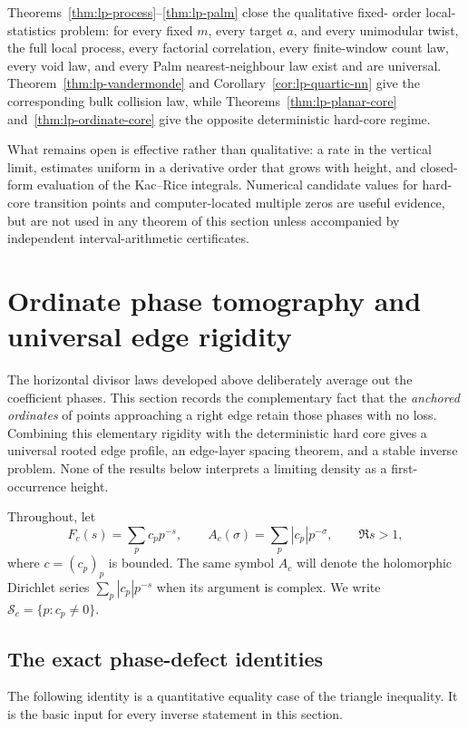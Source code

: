 \documentclass[11pt]{article}
\theoremstyle{definition}
\theoremstyle{remark}
\begin{document}
Theorems~\ref{thm:lp-process}--\ref{thm:lp-palm} close the qualitative fixed-
order local-statistics problem: for every fixed $m$, every target $a$, and
every unimodular twist, the full local process, every factorial correlation,
every finite-window count law, every void law, and every Palm nearest-neighbour
law exist and are universal.  Theorem~\ref{thm:lp-vandermonde} and
Corollary~\ref{cor:lp-quartic-nn} give the corresponding bulk collision law,
while Theorems~\ref{thm:lp-planar-core} and~\ref{thm:lp-ordinate-core} give the
opposite deterministic hard-core regime.

What remains open is effective rather than qualitative: a rate in the vertical
limit, estimates uniform in a derivative order that grows with height, and
closed-form evaluation of the Kac--Rice integrals.  Numerical candidate values
for hard-core transition points and computer-located multiple zeros are useful
evidence, but are not used in any theorem of this section unless accompanied by
independent interval-arithmetic certificates.
\section{Ordinate phase tomography and universal edge rigidity}
\label{sec:edge-rigidity}

The horizontal divisor laws developed above deliberately average out the coefficient
phases.  This section records the complementary fact that the 
\emph{anchored ordinates} of points approaching a right edge retain those phases with
no loss.  Combining this elementary rigidity with the deterministic hard core gives a
universal rooted edge profile, an edge-layer spacing theorem, and a stable inverse
problem.  None of the results below interprets a limiting density as a first-occurrence
height.

Throughout, let
\[
 F_c(s)=\sum_p c_p p^{-s},
 \qquad
 A_c(\sigma)=\sum_p |c_p|p^{-\sigma},
 \qquad \Re s>1,
\]
where $c=(c_p)_p$ is bounded.  The same symbol $A_c$ will denote the
holomorphic Dirichlet series $\sum_p|c_p|p^{-s}$ when its argument is
complex.  We write $\mathcal S_c=\{p:c_p\ne0\}$.

\subsection{The exact phase-defect identities}

The following identity is a quantitative equality case of the triangle inequality.
It is the basic input for every inverse statement in this section.
\end{document}
